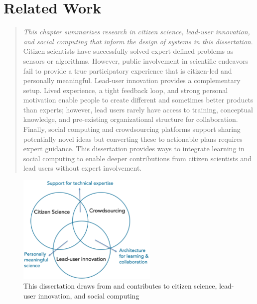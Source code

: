\chapter{Related Work}

\begin{quote}
\emph{This chapter summarizes research in citizen science, lead-user innovation, and social computing that inform the design of systems in this dissertation}. Citizen scientists have successfully solved expert-defined problems as sensors or algorithms. However, public involvement in scientific endeavors fail to provide a true participatory experience that is citizen-led and personally meaningful. Lead-user innovation provides a complementary setup. Lived experience, a tight feedback loop, and strong personal motivation enable people to create different and sometimes better products than experts; however, lead users rarely have access to training, conceptual knowledge, and pre-existing organizational structure for collaboration. Finally, social computing and crowdsourcing platforms support sharing potentially novel ideas but converting these to actionable plans requires expert guidance. This dissertation provides ways to integrate learning in social computing to enable deeper contributions from citizen scientists and lead users without expert involvement.
\end{quote}


\begin{figure}[!h] 
  \centering
  \includegraphics[width=0.6\textwidth]{figures/2-related/venn.png}
  \caption[]
{This dissertation draws from and contributes to citizen science, lead-user innovation, and social computing}
  \label{fig:related-1}
\end{figure}

